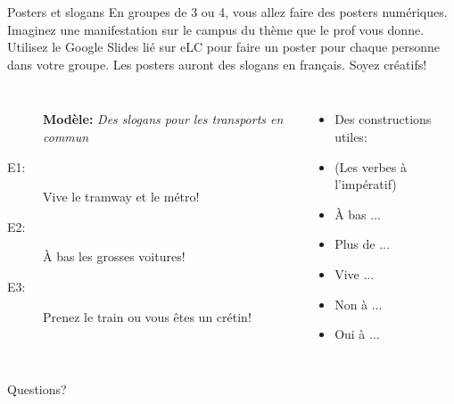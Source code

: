 \documentclass{beamer}
\begin{document}
  \begin{frame}{Posters et slogans}
    En groupes de 3 ou 4, vous allez faire des posters numériques.
    Imaginez une manifestation sur le campus du thème que le prof vous donne.
    Utilisez le Google Slides lié sur eLC pour faire un poster pour chaque personne dans votre groupe.
    Les posters auront des slogans en français.
    Soyez créatifs!
    \begin{columns}[t]
        \begin{description}
          \item[] \textbf{Modèle:} \emph{Des slogans pour les transports en commun}
          \item[E1:] Vive le tramway et le métro!
          \item[E2:] À bas les grosses voitures!
          \item[E3:] Prenez le train ou vous êtes un crétin!
        \end{description}
        \begin{itemize}
          \item[] Des constructions utiles:
          \item (Les verbes à l'impératif)
          \item À bas ... 
          \item Plus de ... 
          \item Vive ...
          \item Non à ...
          \item Oui à ...
        \end{itemize}
    \end{columns}
  \end{frame}

  \begin{frame}{}
    \begin{center}
      \Large Questions?
    \end{center}
  \end{frame}
\end{document}
